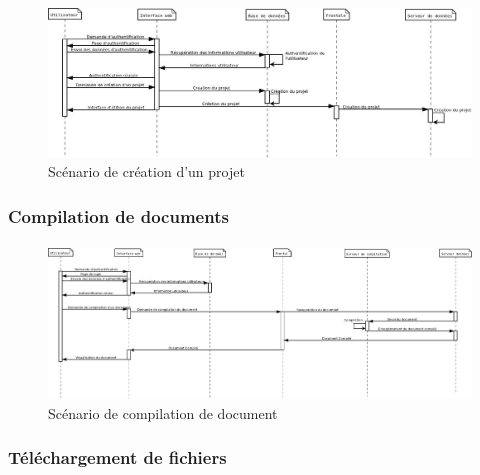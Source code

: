 \documentclass[a4paper,12pt]{article}
\begin{document}
\paragraph{}
\begin{figure}[!ht]
\begin{center}
  \includegraphics[width=1\textwidth, angle=90]{./Diagramme/CreationProjet.jpg}
\end{center}
  \caption{Scénario de création d'un projet}
  \label{createProject}
\end{figure}

\newpage
\subsubsection{Compilation de documents}
\paragraph{}
\begin{figure}[!ht]
\begin{center}
  \includegraphics[width=1\textwidth, angle=90]{./Diagramme/DemandeCompilation.jpg}
\end{center}
  \caption{Scénario de compilation de document}
  \label{compile}
\end{figure}

\newpage
\subsubsection{Téléchargement de fichiers}
\end{document}
